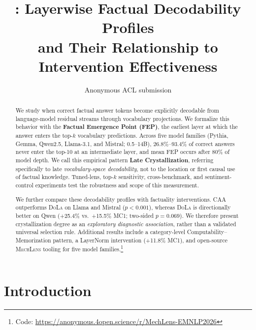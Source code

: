 \documentclass[11pt]{article}
\title{\mechlens{}: Layerwise Factual Decodability Profiles \\
and Their Relationship to Intervention Effectiveness}
\author{
  Anonymous ACL submission
}
\newcommand{\mechlens}{\textsc{MechLens}}
\newcommand{\dola}{\textsc{DoLa}}
\newcommand{\caa}{\textsc{CAA}}
\begin{document}
\maketitle

\begin{abstract}
We study when correct factual answer tokens become explicitly decodable from language-model residual streams through vocabulary projections. We formalize this behavior with the \textbf{Factual Emergence Point (FEP)}, the earliest layer at which the answer enters the top-$k$ vocabulary predictions. Across five model families (Pythia, Gemma, Qwen2.5, Llama-3.1, and Mistral; 0.5--14B), 26.8\%--93.4\% of correct answers never enter the top-10 at an intermediate layer, and mean FEP occurs after 80\% of model depth. We call this empirical pattern \textbf{Late Crystallization}, referring specifically to late \emph{vocabulary-space decodability}, not to the location or first causal use of factual knowledge. Tuned-lens, top-$k$ sensitivity, cross-benchmark, and sentiment-control experiments test the robustness and scope of this measurement.

We further compare these decodability profiles with factuality interventions. \caa{} outperforms \dola{} on Llama and Mistral ($p{<}0.001$), whereas \dola{} is directionally better on Qwen (+25.4\% vs.\ +15.5\% MC1; two-sided $p{=}0.069$). We therefore present crystallization degree as an \emph{exploratory diagnostic association}, rather than a validated universal selection rule. Additional results include a category-level Computability--Memorization pattern, a LayerNorm intervention (+11.8\% MC1), and open-source \mechlens{} tooling for five model families.\footnote{Code: \url{https://anonymous.4open.science/r/MechLens-EMNLP2026}}
\end{abstract}

\section{Introduction}
\label{sec:introduction}
\end{document}

